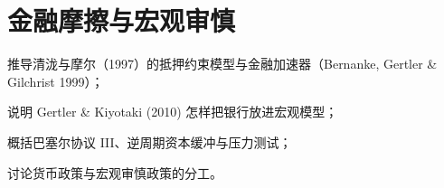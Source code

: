 \chapter{金融摩擦与宏观审慎}\label{ch:frictions}

\begin{chapterguide}
\begin{guidegoals}
\item 推导清泷与摩尔（1997）的抵押约束模型与金融加速器（Bernanke, Gertler \& Gilchrist 1999）；
\item 说明 Gertler \& Kiyotaki (2010) 怎样把银行放进宏观模型；
\item 概括巴塞尔协议 III、逆周期资本缓冲与压力测试；
\item 讨论货币政策与宏观审慎政策的分工。
\end{guidegoals}
\end{chapterguide}

\chapterstub
